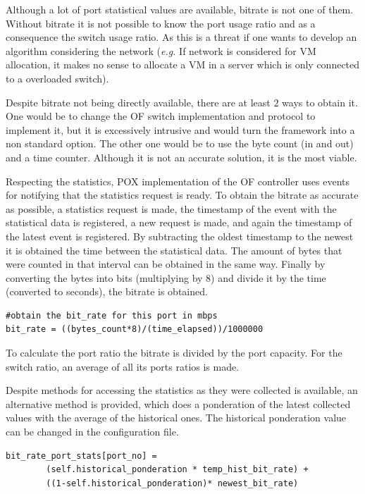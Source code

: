 \documentclass[12pt,english,oneside]{book}
\begin{document}
Although a lot of port statistical values are available, bitrate is not one of them.
Without bitrate it is not possible to know the port usage ratio and as a consequence the switch usage ratio.
As this is a threat if one wants to develop an algorithm considering the network (\textit{e.g.} If network is considered for VM allocation, it makes no sense to allocate a VM in a server which is only connected to a overloaded switch).

Despite bitrate not being directly available, there are at least $2$ ways to obtain it.
One would be to change the OF switch implementation and protocol to implement it, but it is excessively intrusive and would turn the framework into a non standard option.
The other one would be to use the byte count (in and out) and a time counter. Although it is not an accurate solution, it is the most viable.

Respecting the statistics, POX implementation of the OF controller uses events for notifying that the statistics request is ready.
To obtain the bitrate as accurate as possible, a statistics request is made, the timestamp of the event with the statistical data is registered, a new request is made, and again the timestamp of the latest event is registered.
By subtracting the oldest timestamp to the newest it is obtained the time between the statistical data. The amount of bytes that were counted in that interval can be obtained in the same way. Finally by converting the bytes into bits (multiplying by $8$) and divide it by the time (converted to seconds), the bitrate is obtained.

\begin{verbatim}
#obtain the bit_rate for this port in mbps
bit_rate = ((bytes_count*8)/(time_elapsed))/1000000
\end{verbatim}

To calculate the port ratio the bitrate is divided by the port capacity. For the switch ratio, an average of all its ports ratios is made.

Despite methods for accessing the statistics as they were collected is available, an alternative method is provided, which does a ponderation of the latest collected values with the average of the historical ones. The historical ponderation value can be changed in the configuration file.

\begin{verbatim}
bit_rate_port_stats[port_no] = 
        (self.historical_ponderation * temp_hist_bit_rate) + 
        ((1-self.historical_ponderation)* newest_bit_rate)

\end{verbatim}
\end{document}
